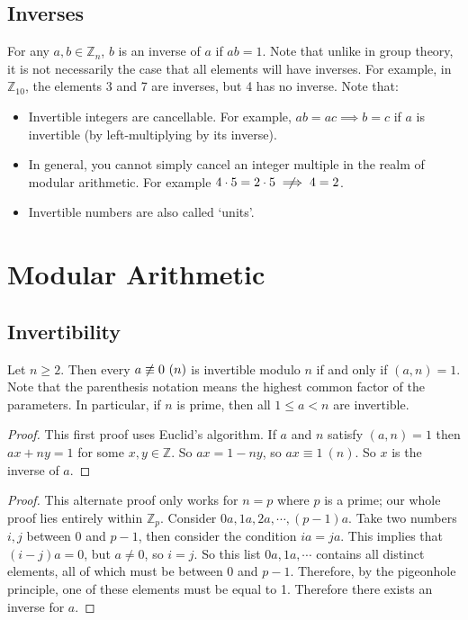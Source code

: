 \documentclass{article}
\begin{document}
	\subsection{Inverses}
	For any $a, b \in \mathbb Z_n$, $b$ is an inverse of $a$ if $ab=1$. Note that unlike in group theory, it is not necessarily the case that all elements will have inverses. For example, in $\mathbb Z_{10}$, the elements 3 and 7 are inverses, but 4 has no inverse. Note that:
	\begin{itemize}
		\item Invertible integers are cancellable. For example, $ab=ac \implies b=c$ if $a$ is invertible (by left-multiplying by its inverse).
		\item In general, you cannot simply cancel an integer multiple in the realm of modular arithmetic. For example $4 \cdot 5 = 2 \cdot 5 \centernot\implies 4 = 2$.
		\item Invertible numbers are also called `units'.
	\end{itemize}

	\section{Modular Arithmetic}
	\subsection{Invertibility}
	\begin{proposition}
		Let $n \geq 2$. Then every $a \centernot\equiv 0\ (n)$ is invertible modulo $n$ if and only if $(a, n) = 1$. Note that the parenthesis notation means the highest common factor of the parameters. In particular, if $n$ is prime, then all $1 \leq a < n$ are invertible.
	\end{proposition}
	\begin{proof}
		This first proof uses Euclid's algorithm. If $a$ and $n$ satisfy $(a, n) = 1$ then $ax + ny = 1$ for some $x, y \in \mathbb Z$. So $ax = 1 - ny$, so $ax \equiv 1\ (n)$. So $x$ is the inverse of $a$.
	\end{proof}
	\begin{proof}
		This alternate proof only works for $n=p$ where $p$ is a prime; our whole proof lies entirely within $\mathbb Z_p$. Consider $0a, 1a, 2a, \cdots, (p-1)a$. Take two numbers $i, j$ between 0 and $p-1$, then consider the condition $ia = ja$. This implies that $(i - j)a = 0$, but $a \neq 0$, so $i=j$. So this list $0a, 1a, \cdots$ contains all distinct elements, all of which must be between 0 and $p-1$. Therefore, by the pigeonhole principle, one of these elements must be equal to 1. Therefore there exists an inverse for $a$.
	\end{proof}
\end{document}
